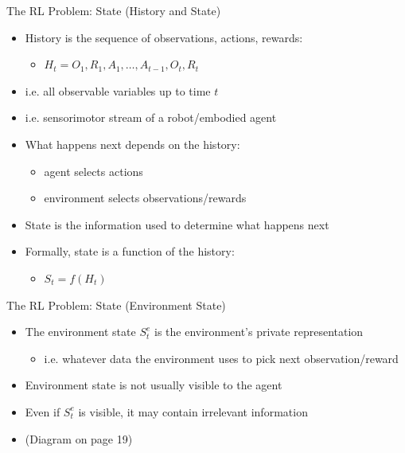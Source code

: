 \documentclass[presentation]{beamer}
\begin{document}
\begin{frame}[label={sec:org711dcf0}]{The RL Problem: State (History and State)}
\begin{itemize}
\item History is the sequence of observations, actions, rewards:
\begin{itemize}
\item \(H_t = O_1, R_1, A_1, \ldots, A_{t-1}, O_t, R_t\)
\end{itemize}
\item i.e. all observable variables up to time \(t\)
\item i.e. sensorimotor stream of a robot/embodied agent
\item What happens next depends on the history:
\begin{itemize}
\item agent selects actions
\item environment selects observations/rewards
\end{itemize}
\item State is the information used to determine what happens next
\item Formally, state is a function of the history:
\begin{itemize}
\item \(S_t = f(H_t)\)
\end{itemize}
\end{itemize}
\end{frame}
\begin{frame}[label={sec:orgc746c5d}]{The RL Problem: State (Environment State)}
\begin{itemize}
\item The environment state \(S^e_t\) is the environment’s private representation
\begin{itemize}
\item i.e. whatever data the environment uses to pick next observation/reward
\end{itemize}
\item Environment state is not usually visible to the agent
\item Even if \(S^e_t\) is visible, it may contain irrelevant information
\item (Diagram on page 19)
\end{itemize}
\end{frame}
\end{document}
